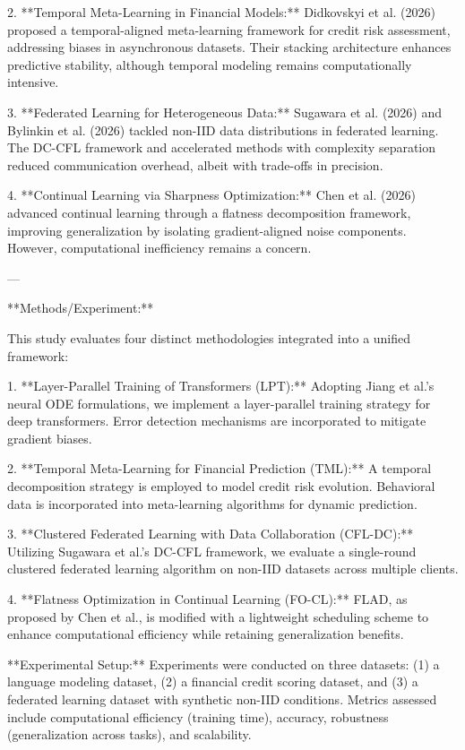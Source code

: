2. **Temporal Meta-Learning in Financial Models:**  
   Didkovskyi et al. (2026) proposed a temporal-aligned meta-learning framework for credit risk assessment, addressing biases in asynchronous datasets. Their stacking architecture enhances predictive stability, although temporal modeling remains computationally intensive.  

3. **Federated Learning for Heterogeneous Data:**  
   Sugawara et al. (2026) and Bylinkin et al. (2026) tackled non-IID data distributions in federated learning. The DC-CFL framework and accelerated methods with complexity separation reduced communication overhead, albeit with trade-offs in precision.  

4. **Continual Learning via Sharpness Optimization:**  
   Chen et al. (2026) advanced continual learning through a flatness decomposition framework, improving generalization by isolating gradient-aligned noise components. However, computational inefficiency remains a concern.  

---

**Methods/Experiment:**  

This study evaluates four distinct methodologies integrated into a unified framework:  

1. **Layer-Parallel Training of Transformers (LPT):**  
   Adopting Jiang et al.'s neural ODE formulations, we implement a layer-parallel training strategy for deep transformers. Error detection mechanisms are incorporated to mitigate gradient biases.  

2. **Temporal Meta-Learning for Financial Prediction (TML):**  
   A temporal decomposition strategy is employed to model credit risk evolution. Behavioral data is incorporated into meta-learning algorithms for dynamic prediction.  

3. **Clustered Federated Learning with Data Collaboration (CFL-DC):**  
   Utilizing Sugawara et al.'s DC-CFL framework, we evaluate a single-round clustered federated learning algorithm on non-IID datasets across multiple clients.  

4. **Flatness Optimization in Continual Learning (FO-CL):**  
   FLAD, as proposed by Chen et al., is modified with a lightweight scheduling scheme to enhance computational efficiency while retaining generalization benefits.  

**Experimental Setup:**  
Experiments were conducted on three datasets: (1) a language modeling dataset, (2) a financial credit scoring dataset, and (3) a federated learning dataset with synthetic non-IID conditions. Metrics assessed include computational efficiency (training time), accuracy, robustness (generalization across tasks), and scalability.  

